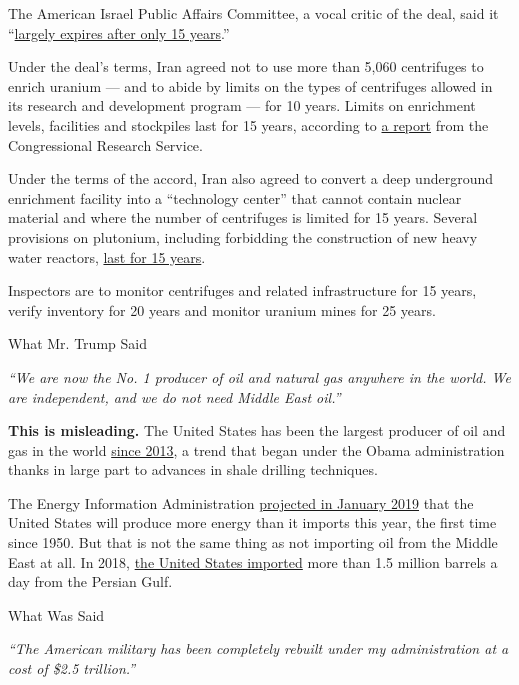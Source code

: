 The American Israel Public Affairs Committee, a vocal critic of the
deal, said it
``\href{https://www.aipac.org/-/media/publications/policy-and-politics/fact-sheets/other/the-iran-nuclear-deal-expiration-dates-and-consequences.pdf}{largely
expires after only 15 years}.''

Under the deal's terms, Iran agreed not to use more than 5,060
centrifuges to enrich uranium --- and to abide by limits on the types of
centrifuges allowed in its research and development program --- for 10
years. Limits on enrichment levels, facilities and stockpiles last for
15 years, according to \href{https://fas.org/sgp/crs/nuke/R43333.pdf}{a
report} from the Congressional Research Service.

Under the terms of the accord, Iran also agreed to convert a deep
underground enrichment facility into a ``technology center'' that cannot
contain nuclear material and where the number of centrifuges is limited
for 15 years. Several provisions on plutonium, including forbidding the
construction of new heavy water reactors,
\href{https://www.belfercenter.org/sites/default/files/legacy/files/IranDealDefinitiveGuide.pdf\#page=13}{last
for 15 years}.

Inspectors are to monitor centrifuges and related infrastructure for 15
years, verify inventory for 20 years and monitor uranium mines for 25
years.

What Mr. Trump Said

\emph{``We are now the No. 1 producer of oil and natural gas anywhere in
the world. We are independent, and we do not need Middle East oil.''}

\textbf{This is misleading.} The United States has been the largest
producer of oil and gas in the world
\href{https://www.eia.gov/todayinenergy/detail.php?id=13251}{since
2013}, a trend that began under the Obama administration thanks in large
part to advances in shale drilling techniques.

The Energy Information Administration
\href{https://www.eia.gov/todayinenergy/detail.php?id=38152}{projected
in January 2019} that the United States will produce more energy than it
imports this year, the first time since 1950. But that is not the same
thing as not importing oil from the Middle East at all. In 2018,
\href{https://www.eia.gov/totalenergy/data/monthly/pdf/mer.pdf\#page=71}{the
United States imported} more than 1.5 million barrels a day from the
Persian Gulf.

What Was Said

\emph{``The American military has been completely rebuilt under my
administration at a cost of \$2.5 trillion.''}


